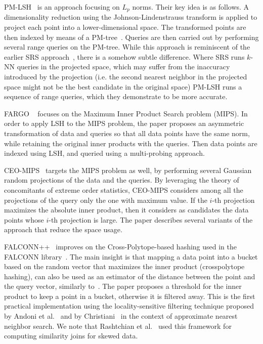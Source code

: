 \documentclass[11pt]{article}
\begin{document}
\textsc{PM-LSH}~\cite{DBLP:journals/vldb/ZhengZWNLJ22}
is an approach
focusing on $L_p$ norms. Their key idea is as follows.
A dimensionality reduction using the Johnson-Lindenstrauss transform is applied to project each point into a lower-dimensional space.
The transformed points are then indexed by means of a
PM-tree~\cite{DBLP:conf/dasfaa/SkopalPS05}. Queries are then carried out
by performing several range queries on the PM-tree. While this approach
is reminiscent of the earlier SRS approach~\cite{DBLP:journals/pvldb/SunWQZL14},
there is a somehow subtle difference. Where SRS runs $k$-NN queries in
the projected space, which may suffer from the inaccuracy introduced by
the projection (i.e. the second nearest neighbor in the projected space
might not be the best candidate in the original space) PM-LSH runs a
sequence of range queries, which they demonstrate to be more accurate.

\textsc{FARGO}
~\cite{DBLP:journals/pvldb/ZhaoZYLXZJ23}
focuses on the Maximum Inner Product Search problem (MIPS). In order to
apply LSH to the MIPS problem, the paper proposes an asymmetric
transformation of data and queries so that all data points have the same
norm, while retaining the original inner products with the queries. Then
data points are indexed using LSH, and queried using a multi-probing approach.

\textsc{CEO-MIPS}~\cite{DBLP:conf/kdd/Pham21} targets the MIPS problem as well,
by performing several Gaussian random projections of the data and the queries.
By leveraging the theory of concomitants of extreme order statistics,
\textsc{CEO-MIPS} considers among all the projections of the query only the one
with maximum value. If the $i$-th projection maximizes the absolute inner product, then it considers as candidates the data points
whose $i$-th projection is large. The paper describes several variants of the
approach that reduce the space usage.

\textsc{FALCONN++}~\cite{DBLP:conf/nips/PhamL22} improves on the
Cross-Polytope-based hashing used in the FALCONN
library~\cite{DBLP:conf/nips/AndoniILRS15}.
The main insight is that
mapping a data point into a bucket based on the random vector that
maximizes the inner product (crosspolytope hashing), can also be used as an estimator of the
distance between the point and the query vector, similarly to~\cite{DBLP:conf/kdd/Pham21}.
The paper proposes a
threshold for the inner product to keep a point in a bucket, otherwise it
is filtered away. This is the first practical implementation using the
locality-sensitive filtering technique proposed by Andoni et
al.~\cite{DBLP:conf/soda/AndoniLRW17} and by
Christiani~\cite{DBLP:conf/soda/Christiani17} in the context of
approximate nearest neighbor search. We note that Rashtchian et
al.~\cite{DBLP:conf/www/RashtchianSW20} used this framework for computing similarity joins for skewed data.
\end{document}
